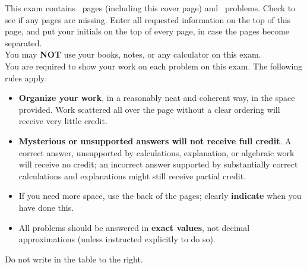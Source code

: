 \documentclass[11pt]{exam}%
\begin{document}
    This exam contains \numpages\ pages (including this cover page) and \numquestions\ problems.  Check to see if any pages are missing.  Enter all requested information on the top of this page, and put your initials on the top of every page, in case the pages become separated.\\
    You may \textbf{NOT} use your books, notes, or any calculator on this exam.\\
    You are required to show your work on each problem on this exam.  The following rules apply:\\
\begin{minipage}[t]{3.7in}%
\vspace{0pt}%
\begin{itemize}%
\item%
\textbf{Organize your work}, in a reasonably neat and coherent way, in
            the space provided. Work scattered all over the page without a clear ordering will
            receive very little credit.%
\item%
\textbf{Mysterious or unsupported answers will not receive full
credit}.  A correct answer, unsupported by calculations, explanation,
or algebraic work will receive no credit; an incorrect answer supported
by substantially correct calculations and explanations might still receive
partial credit.
\item%
If you need more space, use the back of the pages; clearly \textbf{indicate} when you have done this.%
\item%
All problems should be answered in \textbf{exact values}, not decimal approximations (unless instructed explicitly to do so).%
\end{itemize}%
Do not write in the table to the right.%
\end{minipage}%
\hfill%
\begin{minipage}[t]{2.3in}%
\vspace{0pt}%
%
%
\addpoints%
\gradetable[v]%
\end{minipage}%
\newpage%
\addpoints%
\begin{questions}%
\question%
%
\end{questions}%
\end{document}
